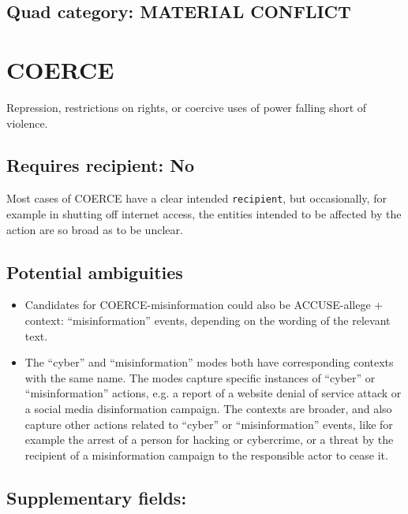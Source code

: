 \documentclass[11pt]{report}
\newcommand{\plcat}[1]{\textsf{#1}}
\newcommand{\txt}[1]{\texttt{#1}}
\begin{document}
\subsection{Quad category: MATERIAL CONFLICT}

\newpage

\section{COERCE}

Repression, restrictions on rights, or coercive uses of power falling short of violence.

\subsection{Requires recipient: No}

Most cases of \plcat{COERCE} have a clear intended \txt{recipient}, but occasionally, for example in shutting off internet access, the entities intended to be affected by the action are so broad as to be unclear.

\subsection{Potential ambiguities}

\begin{itemize}
\item Candidates for COERCE-misinformation could also be ACCUSE-allege + context: ``misinformation'' events, depending on the wording of the relevant text.
\item The ``cyber'' and ``misinformation'' modes both have corresponding contexts with the same name. The modes capture specific instances of ``cyber'' or ``misinformation'' actions, e.g. a report of a website denial of service attack or a social media disinformation campaign. The contexts are broader, and also capture other actions related to ``cyber'' or ``misinformation'' events, like for example the arrest of a person for hacking or cybercrime, or a threat by the recipient of a misinformation campaign to the responsible actor to cease it.
\end{itemize}

\subsection{Supplementary fields: }
\end{document}
